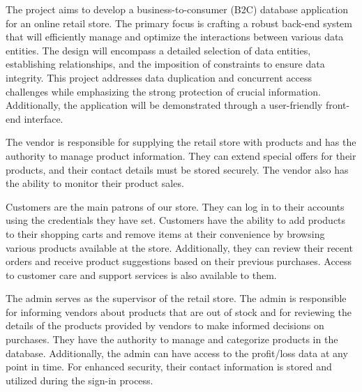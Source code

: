 \documentclass{article}
\begin{document}
\begin{flushleft}
    \par The project aims to develop a business-to-consumer (B2C) database application for an online retail store. The primary focus is crafting a robust back-end system that will efficiently manage and optimize the 
    interactions between various data entities. The design will encompass a detailed selection of data entities, establishing relationships, and the imposition of constraints to ensure data integrity.
    This project addresses data duplication and concurrent access challenges while emphasizing the strong protection of crucial information. Additionally, the application will be demonstrated through a user-friendly front-end interface. \\
    \hspace*{1cm} 
    \par The vendor is responsible for supplying the retail store with products and has the authority to manage product information. 
    They can extend special offers for their products, and their contact details must be stored securely. 
    The vendor also has the ability to monitor their product sales.
    \hspace*{1cm} 
    \par Customers are the main patrons of our store. 
    They can log in to their accounts using the credentials they have set. 
    Customers have the ability to add products to their shopping carts and remove items at their convenience by browsing various products available at the store. 
    Additionally, they can review their recent orders and receive product suggestions based on their previous purchases. 
    Access to customer care and support services is also available to them. \\
    \hspace*{1cm} 
    \par The admin serves as the supervisor of the retail store. 
    The admin is responsible for informing vendors about products that are out of stock and for reviewing the details of the products provided by vendors to make informed decisions on purchases. 
    They have the authority to manage and categorize products in the database. 
    Additionally, the admin can have access to the profit/loss data at any point in time. 
    For enhanced security, their contact information is stored and utilized during the sign-in process.
    
\end{flushleft}
\
\end{document}
